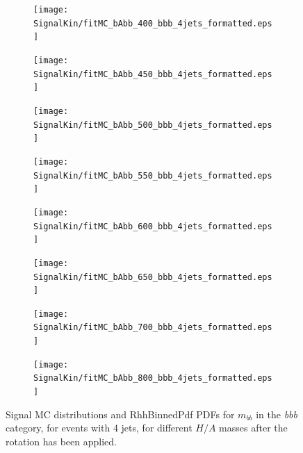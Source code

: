 \begin{figure}[phtb!]
  \begin{center}
  \begin{subfigure}[$m_{A}=400$ GeV]{0.4\textwidth}\texttt{[image: SignalKin/fitMC\_bAbb\_400\_bbb\_4jets\_formatted.eps]}\end{subfigure}
  \begin{subfigure}[$m_{A}=450$ GeV]{0.4\textwidth}\texttt{[image: SignalKin/fitMC\_bAbb\_450\_bbb\_4jets\_formatted.eps]}\end{subfigure}
  \begin{subfigure}[$m_{A}=500$ GeV]{0.4\textwidth}\texttt{[image: SignalKin/fitMC\_bAbb\_500\_bbb\_4jets\_formatted.eps]}\end{subfigure}
  \begin{subfigure}[$m_{A}=550$ GeV]{0.4\textwidth}\texttt{[image: SignalKin/fitMC\_bAbb\_550\_bbb\_4jets\_formatted.eps]}\end{subfigure}
  \begin{subfigure}[$m_{A}=600$ GeV]{0.4\textwidth}\texttt{[image: SignalKin/fitMC\_bAbb\_600\_bbb\_4jets\_formatted.eps]}\end{subfigure}
  \begin{subfigure}[$m_{A}=650$ GeV]{0.4\textwidth}\texttt{[image: SignalKin/fitMC\_bAbb\_650\_bbb\_4jets\_formatted.eps]}\end{subfigure}
  \begin{subfigure}[$m_{A}=700$ GeV]{0.4\textwidth}\texttt{[image: SignalKin/fitMC\_bAbb\_700\_bbb\_4jets\_formatted.eps]}\end{subfigure}
  \begin{subfigure}[$m_{A}=800$ GeV]{0.4\textwidth}\texttt{[image: SignalKin/fitMC\_bAbb\_800\_bbb\_4jets\_formatted.eps]}\end{subfigure}
  \caption{Signal MC distributions and RhhBinnedPdf PDFs for $m_{bb}$ in the {\it bbb} category, for events with 4 jets, for different $H/A$ masses after the rotation has been applied.\label{fig:signalPDFs_4j_bbb}} 
    \end{center}
\end{figure}


